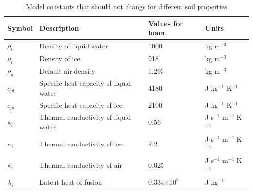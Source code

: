 \documentclass[10pt,a4paper]{article}
\begin{document}
\begin{table}[h]
	\begin{center}
		\begin{tabular}{|p{1.8cm}|p{6cm}|p{3cm}|p{3cm}|}
\hline
Symbol & Description & Values for loam & Units
\\ \hline
$\rho_l$ & Density of liquid water & 1000 & kg m$^{-3}$ \\
$\rho_i$ & Density of ice & 918 & kg m$^{-3}$ \\
$\rho_a$ & Default air density & 1.293 & kg m$^{-3}$ \\
$c_{pl}$ & Specific heat capacity of liquid water & 4180 & J kg$^{-1}$ K$^{-1}$ \\
$c_{pi}$ & Specific heat capacity of ice & 2100 & J kg$^{-1}$ K$^{-1}$ \\
$\kappa_l$ & Thermal conductivity of liquid water & 0.56  & J s$^{-1}$ m$^{-1}$ K$^{-1}$ \\
$\kappa_i$ & Thermal conductivity of ice & 2.2  & J s$^{-1}$ m$^{-1}$ K$^{-1}$ \\
$\kappa_i$ & Thermal conductivity of air & 0.025  & J s$^{-1}$ m$^{-1}$ K$^{-1}$ \\
$\lambda_f$ & Latent heat of fusion & 0.334$\times 10^6$ &  J kg$^{-1}$ \\
\hline
		\end{tabular}
\caption{Model constants that should not change for different soil properties}
	\end{center}
\end{table}
\end{document}
